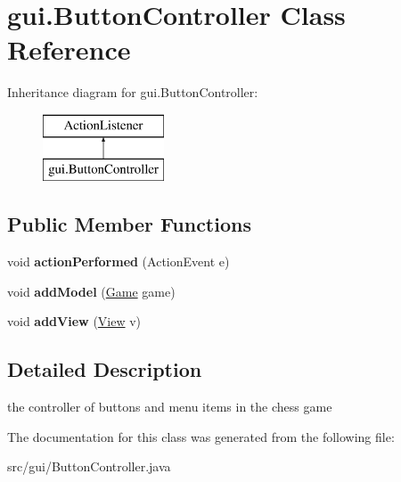 \hypertarget{classgui_1_1_button_controller}{}\section{gui.\+Button\+Controller Class Reference}
\label{classgui_1_1_button_controller}
Inheritance diagram for gui.\+Button\+Controller\+:\begin{figure}[H]
\begin{center}
\leavevmode
\includegraphics[height=2.000000cm]{classgui_1_1_button_controller}
\end{center}
\end{figure}
\subsection*{Public Member Functions}
\begin{DoxyCompactItemize}
\item 
\mbox{\label{classgui_1_1_button_controller_acc997eb17fc420e45f4bf5e43b3ad1c4}} 
void {\bfseries action\+Performed} (Action\+Event e)
\item 
\mbox{\label{classgui_1_1_button_controller_a074abe1c363339b11c37568609011874}} 
void {\bfseries add\+Model} (\mbox{\hyperlink{classgui_1_1_game}{Game}} game)
\item 
\mbox{\label{classgui_1_1_button_controller_ad924f7bcf00e53001fc0fe6c0a86ac2b}} 
void {\bfseries add\+View} (\mbox{\hyperlink{classgui_1_1_view}{View}} v)
\end{DoxyCompactItemize}


\subsection{Detailed Description}
the controller of buttons and menu items in the chess game 

The documentation for this class was generated from the following file\+:\begin{DoxyCompactItemize}
\item 
src/gui/Button\+Controller.\+java\end{DoxyCompactItemize}
